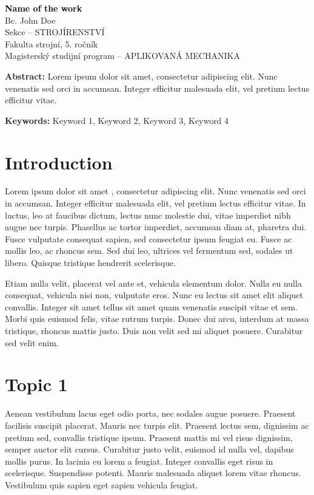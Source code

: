 \documentclass[10pt]{article}
\begin{document}
\begin{center}
\textbf{\Large \textcolor{black} {Name of the work}} \\
\vspace{0.5cm} 
\large Bc. John Doe \\
\vspace{0.5cm}
\large Sekce -- STROJÍRENSTVÍ \\
\large Fakulta strojní, 5. ročník \\
\large Magisterský studijní program -- APLIKOVANÁ MECHANIKA
\end{center}
\vspace{1cm}

\noindent\textbf{Abstract:} Lorem ipsum dolor sit amet, consectetur adipiscing elit. Nunc venenatis sed orci in accumsan. Integer efficitur malesuada elit, vel pretium lectus efficitur vitae.

\vspace{0.25cm}
\noindent\textbf{Keywords:} Keyword 1, Keyword 2, Keyword 3, Keyword 4 
\vspace{0.5cm}

\section{Introduction}
Lorem ipsum dolor sit amet \cites{Bull1996}{Pope2000}{Goody2004}, consectetur adipiscing elit. Nunc venenatis sed orci in accumsan. Integer efficitur malesuada elit, vel pretium lectus efficitur vitae. In luctus, leo at faucibus dictum, lectus nunc molestie dui, vitae imperdiet nibh augue nec turpis. Phasellus ac tortor imperdiet, accumsan diam at, pharetra dui. Fusce vulputate consequat sapien, sed consectetur ipsum feugiat eu. Fusce ac mollis leo, ac rhoncus sem. Sed dui leo, ultrices vel fermentum sed, sodales ut libero. Quisque tristique hendrerit scelerisque.

Etiam nulla velit, placerat vel ante et, vehicula elementum dolor. Nulla eu nulla consequat, vehicula nisi non, vulputate eros. Nunc eu lectus sit amet elit aliquet convallis. Integer sit amet tellus sit amet quam venenatis suscipit vitae et sem. Morbi quis euismod felis, vitae rutrum turpis. Donec dui arcu, interdum at massa tristique, rhoncus mattis justo. Duis non velit sed mi aliquet posuere. Curabitur sed velit enim.

\section{Topic 1}
Aenean vestibulum lacus eget odio porta, nec sodales augue posuere. Praesent facilisis suscipit placerat. Mauris nec turpis elit. Praesent lectus sem, dignissim ac pretium sed, convallis tristique ipsum. Praesent mattis mi vel risus dignissim, semper auctor elit cursus. Curabitur justo velit, euismod id nulla vel, dapibus mollis purus. In lacinia eu lorem a feugiat. Integer convallis eget risus in scelerisque. Suspendisse potenti. Mauris malesuada aliquet lorem vitae rhoncus. Vestibulum quis sapien eget sapien vehicula feugiat.
\end{document}
